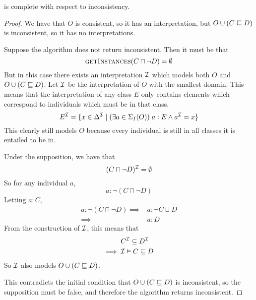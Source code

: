 \documentclass[paper.tex]{subfiles}
\begin{document}
\begin{proposition}
  \label{prop:testSubClassOfInconsistentComplete}
   is complete with respect to inconsistency.
\end{proposition}
\begin{proof}
  We have that $O$ is consistent, so it has an interpretation, but $O \cup (C \sqsubseteq D)$ is inconsistent, so it has no interpretations.

  Suppose the algorithm does not return inconsistent.  Then it must be that
  \[ \Call{getInstances}{C \sqcap \neg D} = \emptyset \]
  But in this case there exists an interpretation $\mathcal{I}$ which models both $O$ and $O \cup (C \sqsubseteq D)$.  Let $\mathcal{I}$ be the interpretation of $O$ with the smallest domain.  This means that the interpretation of any class $E$ only contains elements which correspond to individuals which must be in that class.
  \[ E^{\mathcal{I}} = \{ x \in \Delta^{\mathcal{I}} \mid (\exists a \in \Sigma_I(O)) \; a : E \land a^{\mathcal{I}} = x \} \]
  This clearly still models $O$ because every individual is still in all classes it is entailed to be in.

  Under the supposition, we have that
  \[ (C \sqcap \neg D)^{\mathcal{I}} = \emptyset \]
  So for any individual $a$,
  \[ a : \neg (C \sqcap \neg D) \]
  Letting $a : C$,
  \begin{align*}
    a : \neg (C \sqcap \neg D)
    \implies{}& a : \neg C \sqcup D \\
    \implies{}& a : D
  \end{align*}
  From the construction of $\mathcal{I}$, this means that
  \begin{align*}
    & C^{\mathcal{I}} \subseteq D^{\mathcal{I}} \\
    \implies{}& \mathcal{I} \vDash C \sqsubseteq D
  \end{align*}
  So $\mathcal{I}$ also models $O \cup (C \sqsubseteq D)$.

  This contradicts the initial condition that $O \cup (C \sqsubseteq D)$ is inconsistent, so the supposition must be false, and therefore the algorithm returns inconsistent.
\end{proof}
\end{document}
